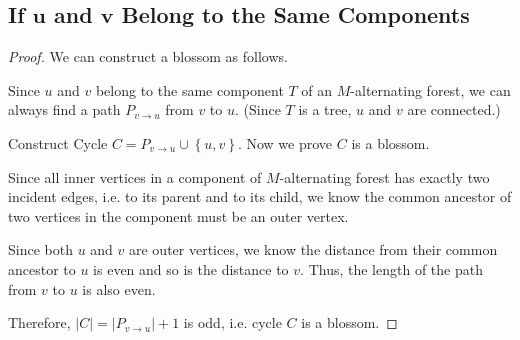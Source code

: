 \documentclass{article}
\newcommand{\set}[1]{\left\{#1\right\}}
\newcommand{\bd}[1]{\boldsymbol{#1}}
\begin{document}
\vspace{1em}
\subsection{If $\bd{u}$ and $\bd{v}$ Belong to the Same Components}
\vspace{0.5em}
\begin{proof}
    We can construct a blossom as follows.
    
    \hspace{1.3em}
    Since $u$ and $v$ belong to the same component $T$ of an $M$-alternating forest, we can always find a path $P_{v\to u}$ from $v$ to $u$. (Since $T$ is a tree, $u$ and $v$ are connected.)
    
    \hspace{1.3em}
    Construct Cycle $C = P_{v\to u}\cup\set{u,v}$. Now we prove $C$ is a blossom.
    
    \hspace{1.3em}
    Since all inner vertices in a component of $M$-alternating forest has exactly two incident edges, i.e. to its parent and to its child, we know the common ancestor of two vertices in the component must be an outer vertex.
    
    \hspace{1.3em}
    Since both $u$ and $v$ are outer vertices, we know the distance from their common ancestor to $u$ is even and so is the distance to $v$. Thus, the length of the path from $v$ to $u$ is also even.
    
    \hspace{1.3em}
    Therefore, $|C|=|P_{v\to u}|+1$ is odd, i.e. cycle $C$ is a blossom.
\end{proof}

\vspace{1em}
\end{document}
